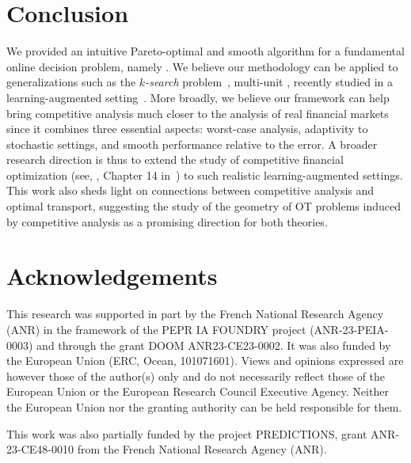 \section{Conclusion}

We provided an intuitive Pareto-optimal and smooth algorithm for a fundamental online decision problem, namely \OMS{}. We believe our methodology can be applied to generalizations such as the {\em $k$-search} problem~\cite{lorenz2009optimal}, \ie multi-unit \OMS{}, recently studied in a learning-augmented setting~\citep{DBLP:conf/eenergy/Lee0HL24}. More broadly, we believe our framework can help bring competitive analysis much closer to the analysis of real financial markets since it combines three essential aspects: worst-case analysis, adaptivity to stochastic settings, and smooth performance relative to the error. A broader research direction is thus to extend the study of competitive financial optimization (see, \eg, Chapter 14 in~\citep{borodin2005online}) to such realistic learning-augmented settings. 
This work also sheds light on connections between competitive analysis and optimal transport, suggesting 
the study of the geometry of OT problems induced by competitive analysis as a promising direction for both theories.



\section*{Acknowledgements}
This research was supported in part by the French National Research Agency (ANR) in the framework of the PEPR IA FOUNDRY project (ANR-23-PEIA-0003) and through the grant DOOM ANR23-CE23-0002. It was also funded by the European Union (ERC, Ocean, 101071601). 
Views and opinions expressed are however those of the author(s) only and do not necessarily reflect those of the European Union or the European Research Council Executive Agency. Neither the European Union nor the granting authority can be held responsible for them.

This work was also partially funded by the project PREDICTIONS, grant ANR-23-CE48-0010 from the French National Research Agency (ANR).